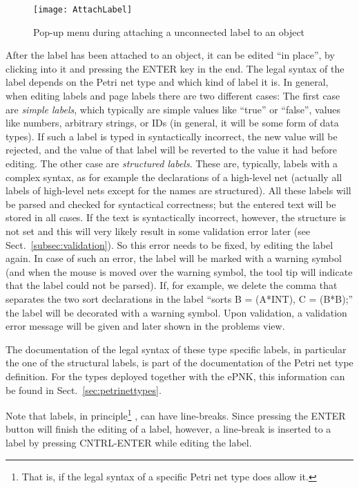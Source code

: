 \begin{figure}[hbt!!]
  \centerline{\texttt{[image: AttachLabel]}}
  \caption{Pop-up menu during attaching a unconnected label to an object}
  \label{fig:label-connection}
\end{figure}

After the label has been attached to an object, it can be edited ``in place'',
by clicking into it and pressing the ENTER key in the end.  The legal syntax of
the label depends on the Petri net type and which kind of label it is. In
general, when editing labels and page labels there are two different
cases: The first case are \emph{simple labels},%
which typically are simple
values like ``true'' or ``false'', values like numbers, arbitrary strings,
or IDs (in general, it will be some form of data types). If such a label is
typed in syntactically incorrect, the new value will be rejected, and the
value of that label will be reverted to the value it had before editing. The
other case are \emph{structured labels}.%
These are, typically, labels with a
complex syntax, as for example the declarations of a high-level net (actually
all labels of high-level nets except for the names are structured). All these
labels will be parsed and checked for syntactical correctness; but the entered
text will be stored in all cases. If the text is syntactically incorrect,
however, the structure is not set and this will very likely result in some
validation%
error later (see Sect.~\ref{subsec:validation}). So this error needs to be
fixed, by editing the label again.  In case of such an error, the label will be marked
with a warning symbol (and when the mouse is moved over the warning symbol,
the tool tip will indicate that the label could not be parsed). If, for example,
we delete the comma that separates the two sort declarations in the label
``sorts B = (A*INT), C = (B*B);'' the label will be decorated with a warning
symbol. Upon validation, a validation error message will be given and later shown in the problems view.


The documentation of the legal syntax of these type specific labels, in
particular the one of the structural labels, is part of the documentation
of the Petri net type definition. For the types deployed together with the
ePNK, this information can be found in Sect.~\ref{sec:petrinettypes}.

Note that labels, in principle\footnote
 {That is, if the legal syntax of a specific Petri net type does allow it.}%
, can have line-breaks.  Since pressing the ENTER button will finish the
editing of a label, however, a line-break is inserted to a label by
pressing CNTRL-ENTER while editing the label.

